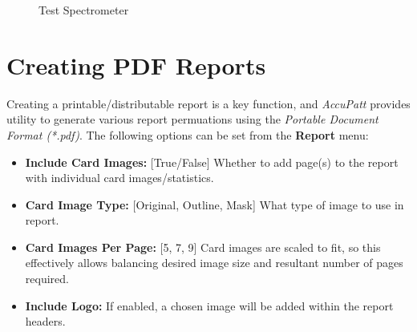 \documentclass[10pt,letterpaper,titlepage]{article}
\begin{document}
    \begin{figure}[hb]
        \centering
        \caption{Test Spectrometer}
        \label{fig:spectrometer_test}
    \end{figure}
    \FloatBarrier
    
    \newpage

    \section{Creating PDF Reports}
    Creating a printable/distributable report is a key function, and \textit{AccuPatt} provides utility to generate various report permuations using the \textit{Portable Document Format (*.pdf)}. The following options can be set from the \textbf{Report} menu:
    \begin{itemize}
        \item \textbf{Include Card Images:} [True/False] Whether to add page(s) to the report with individual card images/statistics.
        \item \textbf{Card Image Type:} [Original, Outline, Mask] What type of image to use in report.
        \item \textbf{Card Images Per Page:} [5, 7, 9] Card images are scaled to fit, so this effectively allows balancing desired image size and resultant number of pages required.
        \item \textbf{Include Logo:} If enabled, a chosen image will be added within the report headers.
    \end{itemize}
\end{document}
